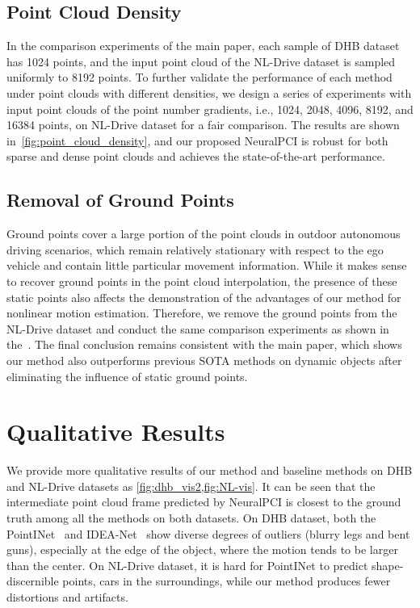 \documentclass[10pt,twocolumn,letterpaper]{article}
\begin{document}
\subsection{Point Cloud Density}

In the comparison experiments of the main paper, each sample of DHB dataset has 1024 points, and the input point cloud of the NL-Drive dataset is sampled uniformly to 8192 points. To further validate the performance of each method under point clouds with different densities, we design a series of experiments with input point clouds of the point number gradients, i.e., 1024, 2048, 4096, 8192, and 16384 points, on NL-Drive dataset for a fair comparison. The results are shown in~\cref{fig:point_cloud_density}, and our proposed NeuralPCI is robust for both sparse and dense point clouds and achieves the state-of-the-art performance.


\subsection{Removal of Ground Points}

Ground points cover a large portion of the point clouds in outdoor autonomous driving scenarios, which remain relatively stationary with respect to the ego vehicle and contain little particular movement information. While it makes sense to recover ground points in the point cloud interpolation, the presence of these static points also affects the demonstration of the advantages of our method for nonlinear motion estimation. Therefore, we remove the ground points from the NL-Drive dataset and conduct the same comparison experiments as shown in the~. The final conclusion remains consistent with the main paper, which shows our method also outperforms previous SOTA methods on dynamic objects after eliminating the influence of static ground points.



\section{Qualitative Results}
\label{sec:appendix qualitative experiments}

We provide more qualitative results of our method and baseline methods on DHB and NL-Drive datasets as \cref{fig:dhb_vis2,fig:NL-vis}. It can be seen that the intermediate point cloud frame predicted by NeuralPCI is closest to the ground truth among all the methods on both datasets. On DHB dataset, both the PointINet~\cite{lu2021pointinet} and IDEA-Net~\cite{zeng2022idea} show diverse degrees of outliers (\eg blurry legs and bent guns), especially at the edge of the object, where the motion tends to be larger than the center. On NL-Drive dataset, it is hard for PointINet to predict shape-discernible points, \eg cars in the surroundings, while our method produces fewer distortions and artifacts. 
\end{document}
